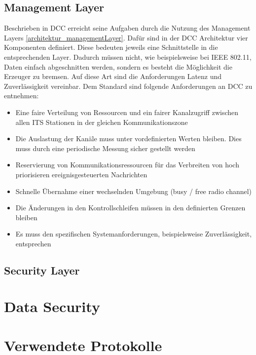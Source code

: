\subsection{Management Layer \label{architektur_managementLayer}}
Beschrieben in \cite{etsi102723-2}
\ac{DCC} erreicht seine Aufgaben durch die Nutzung des Management Layers \ref{architektur_managementLayer}. Dafür sind in der \ac{DCC} Architektur vier Komponenten definiert. Diese bedeuten jeweils eine Schnittstelle in die entsprechenden Layer. Dadurch müssen nicht, wie beispielsweise bei IEEE 802.11, Daten einfach abgeschnitten werden, sondern es besteht die Möglichkeit die Erzeuger zu bremsen. Auf diese Art sind die Anforderungen Latenz und Zuverlässigkeit vereinbar.  Dem Standard \cite{etsi102687} sind folgende Anforderungen an \ac{DCC} zu entnehmen:
\begin{itemize}
	\item Eine faire Verteilung von Ressourcen und ein fairer Kanalzugriff zwischen allen \ac{ITS} Stationen in der gleichen Kommunikationszone
	\item Die Auslastung der Kanäle muss unter vordefinierten Werten bleiben. Dies muss durch eine periodische Messung sicher gestellt werden
	\item Reservierung von Kommunikationsressourcen für das Verbreiten von hoch priorisieren ereignisgesteuerten Nachrichten
	\item Schnelle Übernahme einer wechselnden Umgebung (busy / free radio channel)
	\item Die Änderungen in den Kontrollschleifen müssen in den definierten Grenzen bleiben
	\item Es muss den spezifischen Systemanforderungen, beispielsweise Zuverlässigkeit, entsprechen
\end{itemize}

\subsection{Security Layer \label{architektur_securityLayer}}


\section{Data Security}

\section{Verwendete Protokolle}



